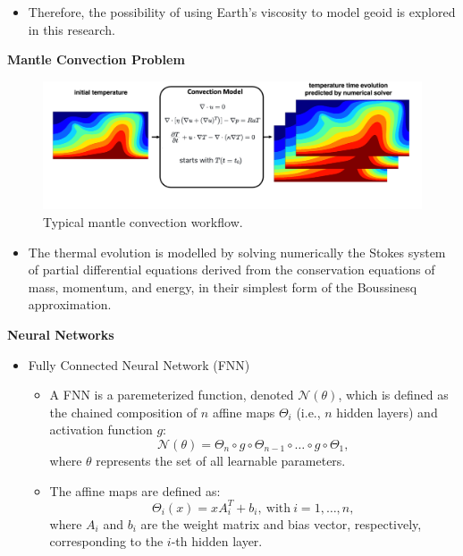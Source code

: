 {\begin{itemize}
     \item Therefore, the possibility of using Earth's viscosity to model geoid is explored in this research.
\end{itemize}

\textbf{Mantle Convection Problem}

\begin{figure}[H]
    \includegraphics[width=\linewidth]{figures/Mantle_Convection_workflow.png}
    \caption{Typical mantle convection workflow.}
\end{figure}

\begin{itemize}
    \item The thermal evolution is modelled by solving numerically the Stokes system of partial differential equations derived from the conservation equations of mass, momentum, and energy, in their simplest form of the Boussinesq approximation. 
\end{itemize}

\textbf{Neural Networks}
\begin{itemize}
    \item Fully Connected Neural Network (FNN)
            \begin{itemize} 
                \item A FNN is a paremeterized function, denoted $\mathcal{N}(\theta)$, which is defined as the chained composition of $n$ affine maps $\Theta_i$ (i.e., $n$ hidden layers) and activation function $g$:
            \begin{equation*}
            \mathcal{N}(\theta) = \Theta_n \circ g \circ \Theta_{n-1} \circ \ldots \circ g \circ \Theta_1,
            \end{equation*}
            where  $\theta$ represents the set of all learnable parameters.
               \item The affine maps are defined as:
            \begin{equation*} \Theta_i(x) = xA_i^{T} + b_i, \ \mathrm{with} \ i=1,\ldots,n, \end{equation*}
            where $A_i$ and $b_i$ are the weight matrix and bias vector, respectively, corresponding to the $i$-th hidden layer.
        \end{itemize}


\end{itemize}}
